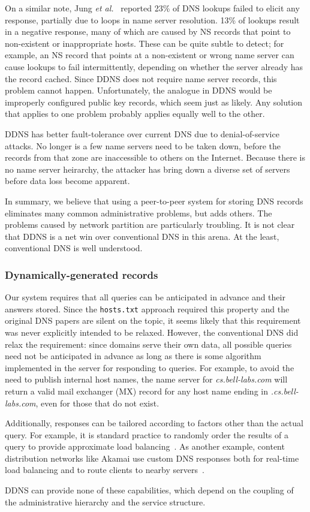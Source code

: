 On a similar note, Jung {\it et al.}~\cite{dnscache:sigcommimw01} 
reported 23\% of 
DNS lookups failed to elicit any response, partially due to loops 
in name server resolution. 13\% of lookups result in a negative 
response, many of which are caused by NS records that point to 
non-existent or inappropriate hosts.
These can be quite subtle to detect; for example, an NS record that points
at a non-existent or wrong name server can cause lookups to fail
intermittently, depending on whether the server already has the 
record cached.
Since DDNS does not require name server records, this problem cannot happen.
Unfortunately, the analogue in DDNS would be improperly
configured public key records, which seem just as likely.
Any solution that applies to one problem
probably applies equally well to the other.

DDNS has better fault-tolerance over current DNS due to 
denial-of-service attacks. No longer is a few name servers need
to be taken down, before the records from that zone 
are inaccessible to others on the Internet. Because there is no 
name server heirarchy, the attacker has bring down a diverse
set of servers before data loss become apparent.

In summary, we believe that using a peer-to-peer system for
storing DNS records eliminates many common administrative
problems, but adds others.
The problems caused by network partition are particularly troubling.
It is not clear that DDNS is a net win over conventional DNS in
this arena.  At the least, conventional DNS is well understood.

\subsubsection{Dynamically-generated records}

Our system requires that all queries
can be anticipated in advance and their answers stored.
Since the {\tt hosts.txt} approach required this property
and the original DNS papers are silent on the topic,
it seems likely that this requirement was never 
explicitly intended to be relaxed.
However, the conventional DNS did relax the requirement:
since domains serve their own data, all possible queries need 
not be anticipated in advance as long as there is some algorithm
implemented in the server for responding to queries.
For example, to avoid the need to publish internal host names,
the name server for
{\em cs.bell-labs.com} will return a valid mail exchanger (MX) record
for any host name ending in {\em .cs.bell-labs.com}, even
for those that do not exist.

Additionally, responses can be tailored according to factors
other than the actual query.
For example, it is standard practice to randomly order the results
of a query to provide approximate load balancing~\cite{dns-load:rfc}.
As another example, content distribution networks like Akamai
use custom DNS responses both for real-time load balancing and
to route clients to nearby servers~\cite{akamai.rev.eng}.

DDNS can provide none of these capabilities, which depend
on the coupling of the administrative hierarchy and the service structure.



